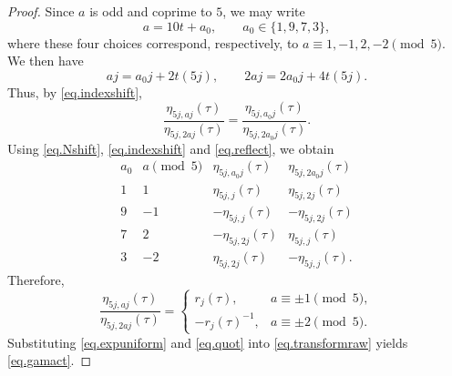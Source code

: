 \documentclass[10pt,a4paper]{amsart}
\begin{document}
\begin{proof}
Since $a$ is odd and coprime to $5$, we may write
\begin{equation*}
a=10t+a_0,
\qquad
a_0\in\{1,9,7,3\},
\end{equation*}
where these four choices correspond, respectively, to
$a\equiv1,-1,2,-2\pmod5$. We then have
\begin{equation*}
aj=a_0j+2t(5j),
\qquad
2aj=2a_0j+4t(5j).
\end{equation*}
Thus, by \eqref{eq.indexshift},
\begin{equation*}
\frac{\eta_{5j,aj}(\tau)}
{\eta_{5j,2aj}(\tau)}
=
\frac{\eta_{5j,a_0j}(\tau)}
{\eta_{5j,2a_0j}(\tau)}.
\end{equation*}	
Using \eqref{eq.Nshift}, \eqref{eq.indexshift} and \eqref{eq.reflect}, we obtain
\begin{equation*}
\begin{array}{c|c|c|c}
a_{0}
& a\pmod5
& \eta_{5j,a_{0}j}(\tau)
& \eta_{5j,2a_{0}j}(\tau)\\ \hline
1 & 1
& \eta_{5j,j}(\tau)
& \eta_{5j,2j}(\tau)\\
9 & -1
& -\eta_{5j,j}(\tau)
& -\eta_{5j,2j}(\tau)\\
7 & 2
& -\eta_{5j,2j}(\tau)
& \eta_{5j,j}(\tau)\\
3 & -2
& \eta_{5j,2j}(\tau)
& -\eta_{5j,j}(\tau).
\end{array}
\end{equation*}
Therefore,
\begin{equation}\label{eq.quot}
\frac{\eta_{5j,aj}(\tau)}
{\eta_{5j,2aj}(\tau)}
=
\begin{cases}
r_{j}(\tau),
& a\equiv\pm1\pmod5,\\[3pt]
-r_{j}(\tau)^{-1},
& a\equiv\pm2\pmod5.
\end{cases}
\end{equation}
Substituting \eqref{eq.expuniform} and \eqref{eq.quot} into
\eqref{eq.transformraw} yields \eqref{eq.gamact}.
\end{proof}
\end{document}
